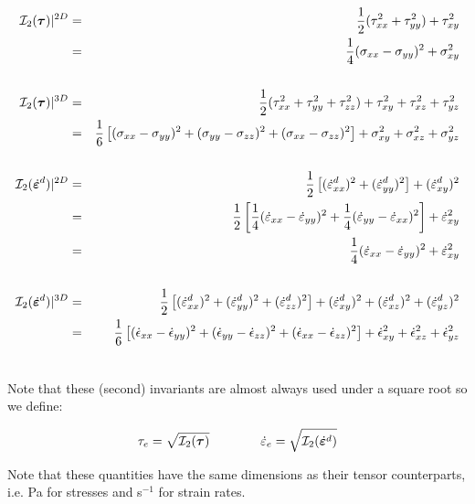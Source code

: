 \begin{eqnarray}
{\cal I}_2({\bm \tau})|^{2D}            
&=& \frac{1}{2} ( \tau_{xx}^2 + \tau_{yy}^2  ) + \tau_{xy}^2   \nonumber\\
&=& \frac{1}{4} (\sigma_{xx} - \sigma_{yy})^2 + \sigma_{xy}^2 \nonumber\\
\nonumber\\
{\cal I}_2({\bm \tau})|^{3D}            
&=&\frac{1}{2}(\tau_{xx}^2 + \tau_{yy}^2 + \tau_{zz}^2 ) + \tau_{xy}^2 + \tau_{xz}^2 + \tau_{yz}^2  \nonumber\\
&=&\frac{1}{6}\left[(\sigma_{xx}-\sigma_{yy})^2 + (\sigma_{yy}-\sigma_{zz})^2 + (\sigma_{xx}-\sigma_{zz})^2 \right] 
   + \sigma_{xy}^2 + \sigma_{xz}^2 + \sigma_{yz}^2 \nonumber \\
\nonumber\\
{\cal I}_2(\dot{\bm{\varepsilon}}^d)|^{2D} 
&=& \frac{1}{2} \left[ (\dot{\varepsilon}_{xx}^d)^2 + (\dot{\varepsilon}_{yy}^d)^2  \right] + (\dot{\varepsilon}_{xy}^d)^2  \nonumber\\
           &=& \frac{1}{2} \left[ 
               \frac{1}{4}(\dot{\varepsilon}_{xx} - \dot{\varepsilon}_{yy})^2 + \frac{1}{4}(\dot{\varepsilon}_{yy} - \dot{\varepsilon}_{xx})^2 
               \right] + \dot{\varepsilon}_{xy}^2  \nonumber\\
           &=& \frac{1}{4} (\dot{\varepsilon}_{xx} - \dot{\varepsilon}_{yy})^2  + \dot{\varepsilon}_{xy}^2  \nonumber\\
\nonumber\\
{\cal I}_2(\dot{\bm{\varepsilon}}^d)|^{3D} 
&=& \frac{1}{2} \left[ (\dot{\varepsilon}_{xx}^d)^2 + (\dot{\varepsilon}_{yy}^d)^2 + (\dot{\varepsilon}_{zz}^d)^2   \right] 
+ (\dot{\varepsilon}_{xy}^d)^2  
+ (\dot{\varepsilon}_{xz}^d)^2  
+ (\dot{\varepsilon}_{yz}^d)^2  \nonumber\\
           &=& \frac{1}{6} \left[ (\dot{\epsilon}_{xx}-\dot{\epsilon}_{yy})^2 + (\dot{\epsilon}_{yy}-\dot{\epsilon}_{zz})^2 + (\dot{\epsilon}_{xx}-\dot{\epsilon}_{zz})^2 \right] 
               + \dot{\epsilon}_{xy}^2 + \dot{\epsilon}_{xz}^2 + \dot{\epsilon}_{yz}^2 \nonumber \\
\nonumber
\end{eqnarray}

Note that these (second) invariants are almost always used under a square root so we define:
\begin{mdframed}[backgroundcolor=blue!5]
\[
\tau_{e}=\sqrt{{\cal I}_2({\bm \tau})}
\quad\quad
\quad\quad
\dot{\varepsilon}_{e}=\sqrt{{\cal I}_2(\dot{\bm \varepsilon}^d)}
\]
\end{mdframed}
Note that these quantities have the same dimensions as their tensor counterparts, i.e. Pa for stresses and s$^{-1}$ for strain rates.

